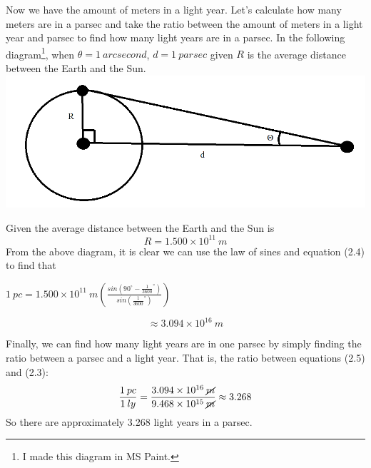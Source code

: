 \documentclass{article}
\begin{document}
Now we have the amount of meters in a light year. Let's calculate how many meters are in a parsec and take the ratio between the amount of meters in a light year and parsec to find how many light years are in a parsec.
\newline\newline
In the following diagram\footnote{I made this diagram in MS Paint.}, when $\theta = 1\: arcsecond$, $d = 1\: parsec$ given $R$ is the average distance between the Earth and the Sun.
\newline
\includegraphics[scale = 0.5]{parsec diagram.png}
\newline

Given the average distance between the Earth and the Sun is 
\begin{equation}
    R = 1.500\times10^{11}\:m
\end{equation}
From the above diagram, it is clear we can use the law of sines and equation (2.4) to find that 

\begin{center}
    $1\:pc = 1.500\times10^{11}\:m(\frac{sin(90^{\circ}-\frac{1}{3600}^{\circ})}{sin(\frac{1}{3600}^{\circ})})$
\end{center}

\begin{equation}
    \approx 3.094\times10^{16}\:m
\end{equation}

Finally, we can find how many light years are in one parsec by simply finding the ratio between a parsec and a light year. That is, the ratio between equations (2.5) and (2.3):
\begin{equation}
    \frac{1\:pc}{1\:ly} = \frac{3.094\times10^{16}\:\cancel{m}}{9.468\times10^{15}\:\cancel{m}}
    \approx 3.268
\end{equation}
So there are approximately 3.268 light years in a parsec.
\end{document}
